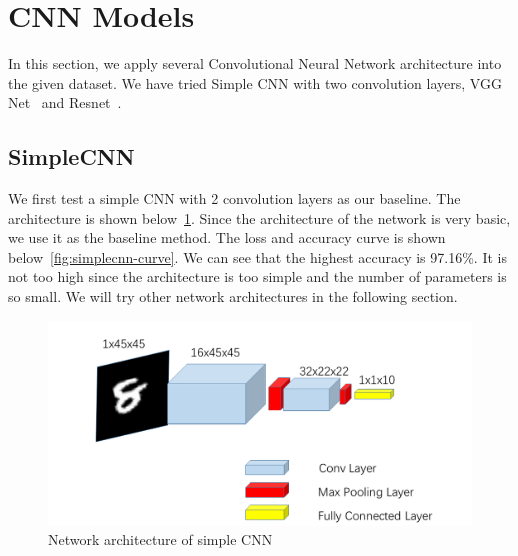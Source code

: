 \documentclass{article}
\begin{document}
\section{CNN Models}

In this section, we apply several Convolutional Neural Network architecture into the given dataset. We have tried Simple CNN with two convolution layers, VGG Net~\cite{simonyan2014very} and Resnet~\cite{he2016deep}.

\subsection{SimpleCNN}

We first test a simple CNN with 2 convolution layers as our baseline. The architecture is shown below~\ref{fig:simplecnn}. Since the architecture of the network is very basic, we use it as the baseline method. The loss and accuracy curve is shown below~\ref{fig:simplecnn-curve}. We can see that the highest accuracy is 97.16\%. It is not too high since the architecture is too simple and the number of parameters is so small. We will try other network architectures in the following section.

\begin{figure}[!htb]
	\centering\includegraphics[width=1.0\textwidth]{fig/simplecnn.png}
	\caption{Network architecture of simple CNN }\label{fig:simplecnn}
\end{figure}
\end{document}
